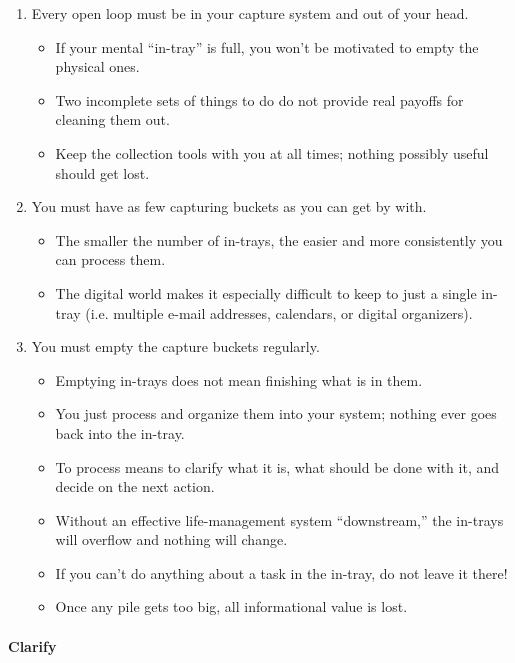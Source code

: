 \documentclass{article}
\begin{document}
\begin{enumerate}
    \item Every open loop must be in your capture system and out of your head.
    \begin{itemize}
      \item If your mental ``in-tray'' is full, you won't be motivated to empty the physical ones.
      \item Two incomplete sets of things to do do not provide real payoffs for cleaning them out.
      \item Keep the collection tools with you at all times; nothing possibly useful should get lost.
    \end{itemize}
    \item You must have as few capturing buckets as you can get by with.
    \begin{itemize}
      \item The smaller the number of in-trays, the easier and more consistently you can process them.
      \item The digital world makes it especially difficult to keep to just a single in-tray (i.e. multiple e-mail addresses, calendars, or digital organizers).
    \end{itemize}
    \item You must empty the capture buckets regularly.
    \begin{itemize}
      \item Emptying in-trays does not mean finishing what is in them.
      \item You just process and organize them into your system; nothing ever goes back into the in-tray.
      \item To process means to clarify what it is, what should be done with it, and decide on the next action.
      \item Without an effective life-management system ``downstream,'' the in-trays will overflow and nothing will change.
      \item If you can't do anything about a task in the in-tray, do not leave it there!
      \item Once any pile gets too big, all informational value is lost.
    \end{itemize}
\end{enumerate}

\paragraph{Clarify}
\end{document}

